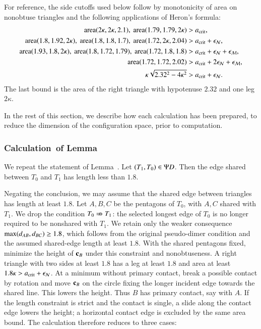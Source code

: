 For reference, the side cutoffs used below follow by monotonicity of
area on nonobtuse triangles and the following applications of Heron's
formula:
\[
\begin{aligned}
{\operatorname{area}}(2\kappa,2\kappa,2.1),\ {\operatorname{area}}(1.79,1.79,2\kappa)&>a_\text{crit},\\
{\operatorname{area}}(1.8,1.92,2\kappa),\ {\operatorname{area}}(1.8,1.8,1.7),\
 {\operatorname{area}}(1.72,2\kappa,2.04)&>a_\text{crit}+\epsilon_{\mathcal N},\\
{\operatorname{area}}(1.93,1.8,2\kappa),\ {\operatorname{area}}(1.8,1.72,1.79),\
 {\operatorname{area}}(1.72,1.8,1.8)&>a_\text{crit}+\epsilon_{\mathcal N}+\epsilon_{\mathcal M},\\
{\operatorname{area}}(1.72,1.72,2.02)&>a_\text{crit}+2\epsilon_{\mathcal N}+\epsilon_{\mathcal M},\\
\kappa\sqrt{2.32^2-4\kappa^2}&>a_\text{crit}+\epsilon_{\mathcal N} .
\end{aligned}
\]
The last bound is the area of the right triangle with hypotenuse
$2.32$ and one leg $2\kappa$.

In the rest of this section, we describe how each calculation has been
prepared, to reduce the dimension of the configuration space, prior to
computation.

\subsubsection{Calculation~of Lemma~} 

We repeat the statement of Lemma~\rif{calc:pseudo1}.  Let
$(T_1,T_0)\in \Psi D$.  Then the edge shared between $T_0$ and $T_1$ has
length less than $1.8$.  %

Negating the conclusion, we may assume that the shared edge between
triangles has length at least $1.8$.  Let $A,B,C$ be the pentagons of
$T_0$, with $A,C$ shared with $T_1$.  We drop the condition
$T_0\nRightarrow T_1$: the selected longest edge of $T_0$ is no longer
required to be nonshared with $T_1$.  We retain only the weaker
consequence $\max(d_{AB},d_{BC})\ge1.8$, which follows from
the original pseudo-dimer condition and the assumed shared-edge
length at least $1.8$. With the shared pentagons fixed, minimize
the height of ${\mathbf c}_B$ under this constraint and nonobtuseness.
A right triangle with two sides at least $1.8$ has a leg at least
$1.8$ and area at least $1.8\kappa>a_\text{crit}+\epsilon_{\mathcal N}$. At a minimum
without primary contact, break a possible contact by rotation and
move ${\mathbf c}_B$ on the circle fixing the longer incident edge towards
the shared line. This lowers the height. Thus $B$ has primary contact,
say with $A$. If the length constraint is strict and the contact is
single, a slide along the contact edge lowers the height; a horizontal
contact edge is excluded by the same area bound. The calculation
therefore reduces to three cases:

